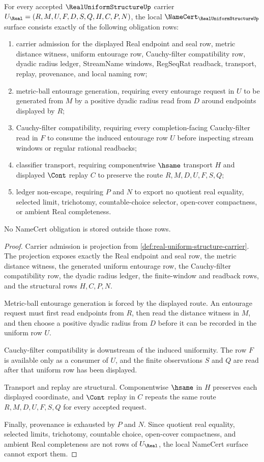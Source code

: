 \begin{theorem}
\label{thm:real-uniform-structure-namecert-obligations}
For every accepted $\RealUniformStructureUp$ carrier $U_{\Real}=(R,M,U,F,D,S,Q,H,C,P,N)$, the local $\NameCert_{\RealUniformStructureUp}$ surface consists exactly of the following obligation rows:
\begin{enumerate}
\item carrier admission for the displayed Real endpoint and seal row, metric distance witness, uniform entourage row, Cauchy-filter compatibility row, dyadic radius ledger, StreamName windows, RegSeqRat readback, transport, replay, provenance, and local naming row;
\item metric-ball entourage generation, requiring every entourage request in $U$ to be generated from $M$ by a positive dyadic radius read from $D$ around endpoints displayed by $R$;
\item Cauchy-filter compatibility, requiring every completion-facing Cauchy-filter read in $F$ to consume the induced entourage row $U$ before inspecting stream windows or regular rational readbacks;
\item classifier transport, requiring componentwise $\hsame$ transport $H$ and displayed $\Cont$ replay $C$ to preserve the route $R,M,D,U,F,S,Q$;
\item ledger non-escape, requiring $P$ and $N$ to export no quotient real equality, selected limit, trichotomy, countable-choice selector, open-cover compactness, or ambient Real completeness.
\end{enumerate}
No NameCert obligation is stored outside those rows.
\end{theorem}
\begin{proof}
Carrier admission is projection from \autoref{def:real-uniform-structure-carrier}. The projection exposes exactly the Real endpoint and seal row, the metric distance witness, the generated uniform entourage row, the Cauchy-filter compatibility row, the dyadic radius ledger, the finite-window and readback rows, and the structural rows $H,C,P,N$.

Metric-ball entourage generation is forced by the displayed route. An entourage request must first read endpoints from $R$, then read the distance witness in $M$, and then choose a positive dyadic radius from $D$ before it can be recorded in the uniform row $U$.

Cauchy-filter compatibility is downstream of the induced uniformity. The row $F$ is available only as a consumer of $U$, and the finite observations $S$ and $Q$ are read after that uniform row has been displayed.

Transport and replay are structural. Componentwise $\hsame$ in $H$ preserves each displayed coordinate, and $\Cont$ replay in $C$ repeats the same route $R,M,D,U,F,S,Q$ for every accepted request.

Finally, provenance is exhausted by $P$ and $N$. Since quotient real equality, selected limits, trichotomy, countable choice, open-cover compactness, and ambient Real completeness are not rows of $U_{\Real}$, the local NameCert surface cannot export them.
\end{proof}
